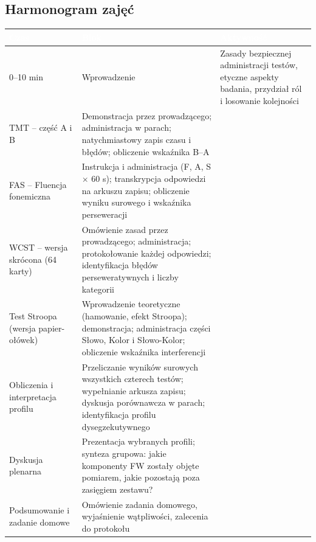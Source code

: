 \documentclass[11pt,a4paper]{article}
\begin{document}
\subsection{Harmonogram zajęć}

\begin{table}[htbp]
\centering
\small
\begin{tabularx}{\textwidth}{p{1.8cm} p{3.2cm} X}
\toprule
\rowcolor{headerblue}
\textcolor{white}{\textbf{Czas}} & \textcolor{white}{\textbf{Blok}} & \textcolor{white}{\textbf{Aktywność}} \\
\midrule
0--10 min & Wprowadzenie & Zasady bezpiecznej administracji testów, etyczne aspekty badania, przydział ról i losowanie kolejności \\
\rowcolor{rowblue}
TMT -- część A i B & Demonstracja przez prowadzącego; administracja w parach; natychmiastowy zapis czasu i błędów; obliczenie wskaźnika B--A \\  FAS -- Fluencja fonemiczna & Instrukcja i administracja (F, A, S $\times$ 60 s); transkrypcja odpowiedzi na arkuszu zapisu; obliczenie wyniku surowego i wskaźnika perseweracji \\
\rowcolor{rowblue}
WCST -- wersja skrócona (64 karty) & Omówienie zasad przez prowadzącego; administracja; protokołowanie każdej odpowiedzi; identyfikacja błędów perseweratywnych i liczby kategorii \\
Test Stroopa (wersja papier-ołówek) & Wprowadzenie teoretyczne (hamowanie, efekt Stroopa); demonstracja; administracja części Słowo, Kolor i Słowo-Kolor; obliczenie wskaźnika interferencji \\
\rowcolor{rowblue}
Obliczenia i interpretacja profilu & Przeliczanie wyników surowych wszystkich czterech testów; wypełnianie arkusza zapisu; dyskusja porównawcza w parach; identyfikacja profilu dysegzekutywnego \\
Dyskusja plenarna & Prezentacja wybranych profili; synteza grupowa: jakie komponenty FW zostały objęte pomiarem, jakie pozostają poza zasięgiem zestawu? \\
\rowcolor{rowblue}
Podsumowanie i zadanie domowe & Omówienie zadania domowego, wyjaśnienie wątpliwości, zalecenia do protokołu \\
\bottomrule
\end{tabularx}
\end{table}
\end{document}
